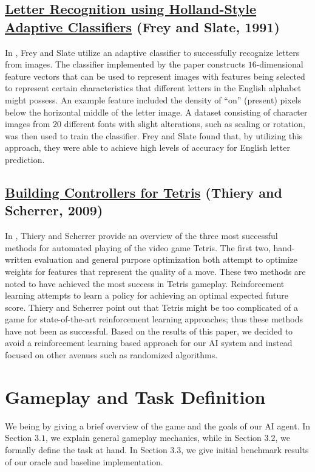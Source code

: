 \documentclass[12pt]{IEEEtran}
\begin{document}
\subsection{\href{https://http://cns-classes.bu.edu/cn550/Readings/frey-slate-91.pdf}{Letter Recognition using Holland-Style Adaptive Classifiers} (Frey and Slate, 1991)}
In \cite{1}, Frey and Slate utilize an adaptive classifier to successfully recognize letters from images. The classifier implemented by the paper constructs $16$-dimensional feature vectors that can be used to represent images with features being selected to represent certain characteristics that different letters in the English alphabet might possess. An example feature included the density of ``on'' (present) pixels below the horizontal middle of the letter image. A dataset consisting of character images from $20$ different fonts with slight alterations, such as scaling or rotation, was then used to train the classifier. Frey and Slate found that, by utilizing this approach, they were able to achieve high levels of accuracy for English letter prediction.

\subsection{\href{https://hal.inria.fr/inria-00418954/document}{Building Controllers for Tetris} (Thiery and Scherrer, 2009)}
In \cite{2}, Thiery and Scherrer provide an overview of the three most successful methods for automated playing of the video game Tetris. The first two, hand-written evaluation and general purpose optimization both attempt to optimize weights for features that represent the quality of a move. These two methods are noted to have achieved the most success in Tetris gameplay. Reinforcement learning attempts to learn a policy for achieving an optimal expected future score. Thiery and Scherrer point out that Tetris might be too complicated of a game for state-of-the-art reinforcement learning approaches; thus these methods have not been as successful. Based on the results of this paper, we decided to avoid a reinforcement learning based approach for our AI system and instead focused on other avenues such as randomized algorithms.

\section{Gameplay and Task Definition}

We being by giving a brief overview of the game and the goals of our AI agent. In Section $3.1$, we explain general gameplay mechanics, while in Section $3.2$, we formally define the task at hand. In Section $3.3$, we give initial benchmark results of our oracle and baseline implementation.
\end{document}
